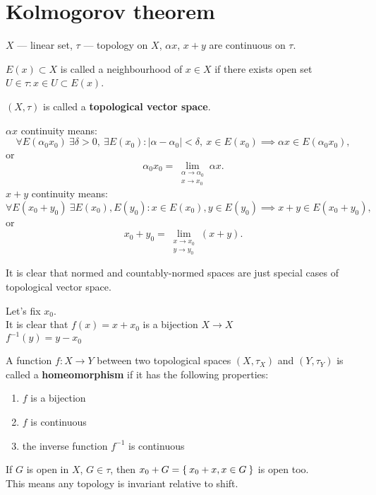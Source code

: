 \section{Kolmogorov theorem}
\begin{defn}
  $X$ --- linear set, $\tau$ --- topology on $X$, $\alpha x$, $x + y$ are
  continuous on $\tau$.

  \noindent $E(x) \subset X$ is called a neighbourhood of $x \in X$ if there
  exists open set $U \in \tau: x \in U \subset E(x)$.
  
  \noindent $(X, \tau)$ is called a \textbf{topological vector space}.
  
  \noindent $\alpha x$ continuity means:
  \[
    \forall E(\alpha_0 x_0)\ \exists \delta > 0,\ \exists E(x_0) \colon
    |\alpha - \alpha_0| < \delta,\ x \in E(x_0) \implies
    \alpha x \in E(\alpha_0 x_0),
  \]
  or
  \[
    \alpha_0 x_0 = \lim_{\substack{\alpha \to \alpha _0\\ x \to x_0}} \alpha x.
  \]
  \noindent $x + y$ continuity means:
  \[
    \forall E(x_0 + y_0)\ \exists E(x_0), E(y_0) \colon
    x \in E(x_0), y \in E(y_0) \implies x + y \in E(x_0 + y_0),
  \]
  or 
  \[
    x_0 + y_0 = \lim_{\substack{x \to x_0\\ y \to y_0}}(x + y).
  \]
\end{defn}

\noindent
It is clear that normed and countably-normed spaces are just special cases of
topological vector space.

\noindent
Let's fix $x_0$.\\
It is clear that $f(x) = x + x_0$ is a bijection $X \to X$ \\
$f^{-1}(y) = y - x_0$

\begin{defn}
  A function $f \colon X \to Y$ between two topological spaces $(X, \tau_X)$ and
  $(Y, \tau_Y)$ is called a \textbf{homeomorphism} if it has the following properties:
  \begin{enumerate}
  \item $f$ is a bijection
  \item $f$ is continuous 
  \item the inverse function $f^{-1}$ is continuous
  \end{enumerate}
\end{defn}

\noindent
If $G$ is open in $X$, $G \in \tau$, then $x_0 + G = \Set{x_0 + x, x \in G}$ is
open too. \\
This means any topology is invariant relative to shift.

